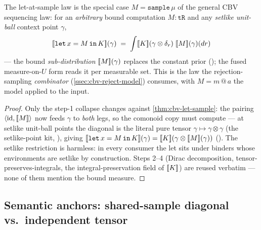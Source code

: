 \begin{lemma}%
\label{lem:cbv-let-general}
\rocqok
{}\rocqok
{}\rocqok
{}
The let-at-sample law is the special case $M = \mathtt{sample}\,\mu$
of the general CBV sequencing law: for an \emph{arbitrary} bound
computation $M : \mathtt{tR}$ and any \emph{setlike unit-ball}
context point $\gamma$,
\[
  [\![ \mathtt{let}\,x = M\,\mathtt{in}\,K ]\!](\gamma)
  \;=\;
  \int [\![ K ]\!](\gamma \otimes \delta_r)\;[\![ M ]\!](\gamma)(dr)
\]
--- the bound \emph{sub-distribution} $[\![ M ]\!](\gamma)$ replaces the
constant prior
(); the fused
measure-on-$U$ form
 reads it per
measurable set. This is the law the rejection-sampling
\emph{combinator} (\autoref{ssec:cbv-reject-model}) consumes, with
$M = m\,@\,a$ the model applied to the input.
\end{lemma}

\begin{proof}
Only the step-1 collapse changes against
\autoref{thm:cbv-let-sample}: the pairing
$\langle\mathrm{id}, [\![ M ]\!]\rangle$ now feeds $\gamma$ to
\emph{both} legs, so the comonoid copy must compute --- at setlike
unit-ball points the diagonal is the literal pure tensor
$\gamma \mapsto \gamma \otimes \gamma$ (the setlike-point kit,
), giving
$[\![ \mathtt{let}\,x = M\,\mathtt{in}\,K ]\!](\gamma) =
[\![ K ]\!](\gamma \otimes [\![ M ]\!](\gamma))$
().
The setlike restriction is harmless: in every consumer the let sits
under binders whose environments are setlike by construction. Steps
2--4 (Dirac decomposition, tensor-preserves-integrals, the
integral-preservation field of $[\![ K ]\!]$) are reused verbatim ---
none of them mention the bound measure.
\end{proof}

\subsection{Semantic anchors: shared-sample diagonal vs.\ independent
tensor}\label{ssec:cbv-anchors}

